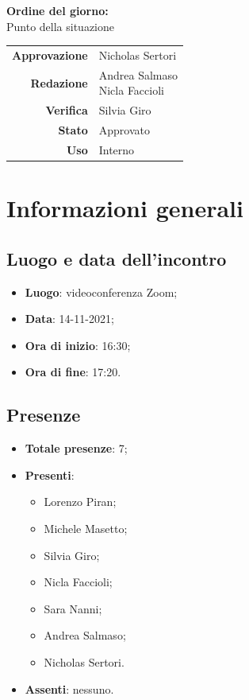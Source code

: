 \documentclass[11pt]{article}
\begin{document}
\begin{titlepage}
\begin{center}
			\large
			
			\vfill
			\textbf{Ordine del giorno:} \\
			Punto della situazione
			\vfill
			
			\begin{tabular}{r|l}
				\textbf{Approvazione} &  Nicholas Sertori\\
				\textbf{Redazione} &  \parbox[t]{3.5cm}{Andrea Salmaso \\Nicla Faccioli}\\
				\textbf{Verifica} &  Silvia Giro\\
				\textbf{Stato} & Approvato \\
				\textbf{Uso} & Interno
			\end{tabular}
			\vfill
			
		\end{center}
	\end{titlepage}

	\newpage

	\section{Informazioni generali}
	\subsection{Luogo e data dell'incontro}
	\begin{itemize}
		\item \textbf{Luogo}: videoconferenza Zoom;
		\item \textbf{Data}: 14-11-2021;
		\item \textbf{Ora di inizio}: 16:30;
		\item \textbf{Ora di fine}: 17:20.
	\end{itemize}
	
	\subsection{Presenze}
	\begin{itemize}
		\item \textbf{Totale presenze}: 7;
		\item \textbf{Presenti}:
		\begin{itemize}
			\item Lorenzo Piran;
			\item Michele Masetto;
			\item Silvia Giro;
			\item Nicla Faccioli;
			\item Sara Nanni;
			\item Andrea Salmaso;
			\item Nicholas Sertori.		
		\end{itemize}
		\item \textbf{Assenti}: nessuno.
	\end{itemize}
\end{document}
